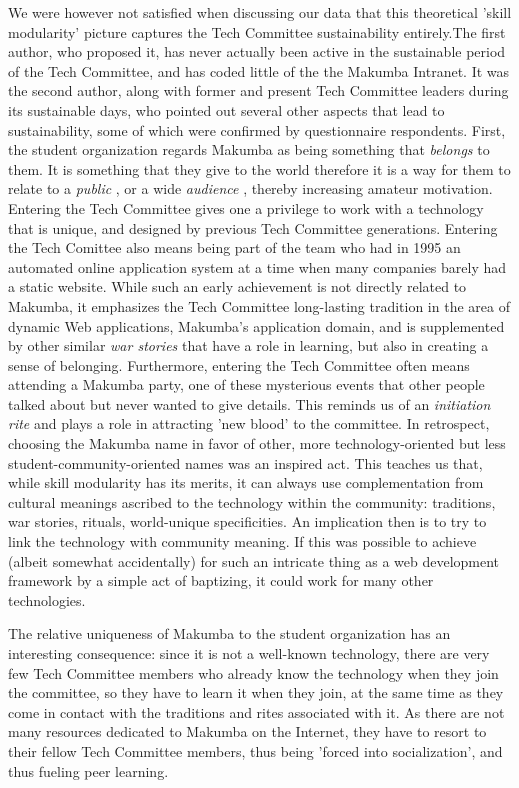 \documentclass{sig-alt-release2}
\begin{document}
We were however not satisfied when discussing our data that this theoretical 'skill modularity' picture captures the Tech Committee sustainability entirely.The first author, who proposed it, has never actually been active in the sustainable period of the Tech Committee, and has coded little of the the Makumba Intranet. It was the second author, along with former and present Tech Committee leaders during its sustainable days, who pointed out  several other aspects that lead to sustainability, some of which were confirmed by questionnaire respondents. First, the student organization regards Makumba as being something that \textit{belongs} to them. It is something that they give to the world therefore it is a way for them to relate to a \textit{public} \cite{stebbins79}, or a wide \textit{audience} \cite{bogdan03}, thereby increasing amateur motivation. Entering the Tech Committee gives one a privilege to work with a technology that is unique, and designed by previous Tech Committee generations. Entering the Tech Comittee also means being part of the team who had in 1995 an automated online application system at a time when many companies barely had a static website. While such an early achievement is not directly related to Makumba, it emphasizes the Tech Committee long-lasting tradition in the area of dynamic Web applications, Makumba's application domain, and is supplemented by other similar \textit{war stories} \cite{orr96} that have a role in learning, but also in creating a sense of belonging. Furthermore, entering the Tech Committee often means attending a Makumba party, one of these mysterious events that other people talked about but never wanted to give details. This reminds us of an \textit{initiation rite} \cite{vanGennep60} and plays a role in attracting 'new blood' to the committee.
In retrospect, choosing the Makumba name in favor of other, more technology-oriented but less student-community-oriented names was an inspired act. This teaches us that, while skill modularity has its merits, it can always use complementation from cultural meanings ascribed to the technology within the community: traditions, war stories, rituals, world-unique specificities. An implication then is to try to link the technology with community meaning. If this was possible to achieve (albeit somewhat accidentally) for such an intricate thing as a web development framework by a simple act of baptizing, it could work for many other technologies.

The relative uniqueness of Makumba to the student organization has an interesting consequence: since it is not a well-known technology, there are very few Tech Committee members who already know the technology when they join the committee, so they have to learn it when they join, at the same time as they come in contact with the traditions and rites associated with it. As there are not many resources dedicated to Makumba on the Internet, they have to resort to their fellow Tech Committee members, thus being 'forced into socialization', and thus fueling peer learning.
\end{document}
